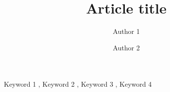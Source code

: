 \documentclass[review]{elsarticle}
\begin{document}
\begin{frontmatter}

\title{Article title}

\author[firstAddress,secondAddress]{Author 1}
\author[secondAddress]{Author 2}

\address[firstAddress]{First address}
\address[secondAddress]{Second address}

\begin{abstract}
    \lipsum[2-3]
\end{abstract}

\begin{keyword}
    Keyword 1 \sep{} Keyword 2 \sep{} Keyword 3 \sep{} Keyword 4
\end{keyword}

\end{frontmatter}

\linenumbers{}







\printbibliography{}
\end{document}
